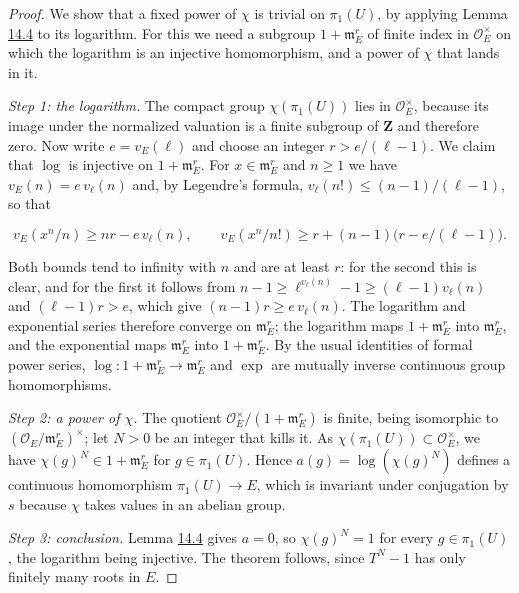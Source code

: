 \documentclass[11pt]{article}
\begin{document}
\begin{proof}[{Proof}]\label{bp59}%
We show that a fixed power of \(\chi\) is trivial on \(\pi_1(U)\), by applying Lemma \hyperref[bp55]{14.4} to its logarithm. For this we need a subgroup \(1+\mathfrak m_E^r\) of finite index in \(\mathcal O_E^\times\) on which the logarithm is an injective homomorphism, and a power of \(\chi\) that lands in it.

\emph{Step 1: the logarithm.} The compact group \(\chi(\pi_1(U))\) lies in \(\mathcal O_E^\times\), because its image under the normalized valuation is a finite subgroup of \(\mathbf Z\) and therefore zero. Now write \(e=v_E(\ell)\) and choose an integer \(r>e/(\ell-1)\). We claim that \(\log\) is injective on \(1+\mathfrak m_E^r\). For \(x\in\mathfrak m_E^r\) and \(n\ge1\) we have \(v_E(n)=e\,v_\ell(n)\) and, by Legendre's formula, \(v_\ell(n!)\le(n-1)/(\ell-1)\), so that

\[
v_E(x^n/n)\ge nr-e\,v_\ell(n),
\qquad
v_E(x^n/n!)\ge r+(n-1)\bigl(r-e/(\ell-1)\bigr).
\]

Both bounds tend to infinity with \(n\) and are at least \(r\): for the second this is clear, and for the first it follows from \(n-1\ge\ell^{v_\ell(n)}-1\ge(\ell-1)v_\ell(n)\) and \((\ell-1)r>e\), which give \((n-1)r\ge e\,v_\ell(n)\). The logarithm and exponential series therefore converge on \(\mathfrak m_E^r\); the logarithm maps \(1+\mathfrak m_E^r\) into \(\mathfrak m_E^r\), and the exponential maps \(\mathfrak m_E^r\) into \(1+\mathfrak m_E^r\). By the usual identities of formal power series, \(\log:1+\mathfrak m_E^r\to\mathfrak m_E^r\) and \(\exp\) are mutually inverse continuous group homomorphisms.

\emph{Step 2: a power of \(\chi\).} The quotient \(\mathcal O_E^\times/(1+\mathfrak m_E^r)\) is finite, being isomorphic to \((\mathcal O_E/\mathfrak m_E^r)^\times\); let \(N>0\) be an integer that kills it. As \(\chi(\pi_1(U))\subset\mathcal O_E^\times\), we have \(\chi(g)^N\in1+\mathfrak m_E^r\) for \(g\in\pi_1(U)\). Hence \(a(g)=\log(\chi(g)^N)\) defines a continuous homomorphism \(\pi_1(U)\to E\), which is invariant under conjugation by \(s\) because \(\chi\) takes values in an abelian group.

\emph{Step 3: conclusion.} Lemma \hyperref[bp55]{14.4} gives \(a=0\), so \(\chi(g)^N=1\) for every \(g\in\pi_1(U)\), the logarithm being injective. The theorem follows, since \(T^N-1\) has only finitely many roots in \(E\).
\end{proof}
\end{document}
